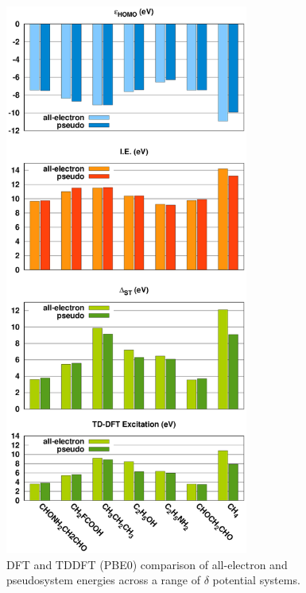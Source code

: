 \documentclass[aip,reprint,nofootinbib]{revtex4-1}
\begin{document}
\begin{figure}
\begin{center}
\includegraphics[width=8cm]{delta_pbe0}
\end{center}
\caption[Energy level results for $\delta$ pseudopotentials.]{DFT and TDDFT (PBE0) comparison of all-electron and pseudosystem energies across a range of $\delta$ potential systems.}\label{fig:delta_graphs}
\end{figure}
\end{document}
